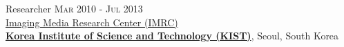 \documentclass[letterpaper,10pt]{article} %
\newcommand{\blankline}{\quad\pagebreak[2]}
\begin{document}
{{Researcher \hfill{\textsc{Mar 2010 - Jul 2013}}\\
\href{https://www.imrc.kist.re.kr/en/}{Imaging Media Research Center (IMRC)}\\
\href{https://eng.kist.re.kr/}{\textbf{Korea Institute of Science and Technology (KIST)}}, Seoul, South Korea\\
%		
%		
%		
%		
\blankline

%


}}
\end{document}
